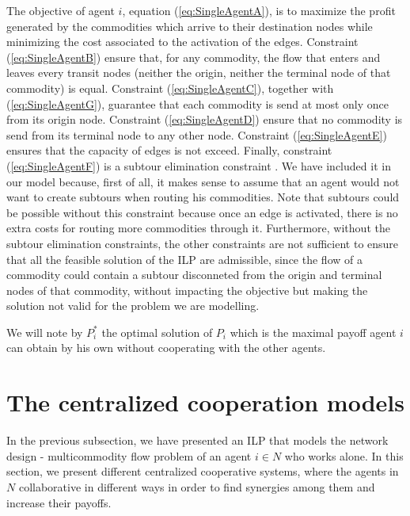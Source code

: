 \documentclass[review]{elsarticle}
\begin{document}
The objective of agent $i$, equation (\ref{eq:SingleAgentA}), is to maximize the
profit generated by the commodities which arrive to their destination nodes
while minimizing the cost associated to the activation of the edges. Constraint
(\ref{eq:SingleAgentB}) ensure that, for any commodity, the flow that enters
and leaves every transit nodes (neither the origin, neither the terminal node of
that commodity) is equal. Constraint (\ref{eq:SingleAgentC}), together with
(\ref{eq:SingleAgentG}), guarantee that each commodity is send at most only once
from its origin node. Constraint (\ref{eq:SingleAgentD}) ensure that no
commodity is send from its terminal node to any other node. Constraint (\ref{eq:SingleAgentE})
ensures that the capacity of edges is not exceed. Finally, constraint
(\ref{eq:SingleAgentF}) is a subtour elimination constraint \cite{AHUJA1993}. We have included it in our model because, first of all, it makes sense to assume that an agent would not want to create subtours when routing his commodities. Note that subtours could be possible without this constraint because once an edge is activated, there is no extra costs for routing more commodities through it. Furthermore, without the subtour elimination constraints, the other constraints are not sufficient to ensure that all the feasible solution of the ILP are admissible, since the flow of a commodity could contain a subtour disconneted from the origin and terminal nodes of that commodity, without impacting the objective but making the solution not valid for the problem we are modelling.

We will note by $P_i^*$ the optimal solution of $P_i$ which is the maximal
payoff agent $i$ can obtain by his own without cooperating with the other agents.

\section{The centralized cooperation models} \label{seq:centrmodels}

In the previous subsection, we have presented an ILP that models the network design - multicommodity flow problem of an agent $i\in N$ who works alone. In this section, we present different centralized cooperative systems, where the agents in $N$ collaborative in different ways in order to find synergies among them and increase their payoffs.
\end{document}
